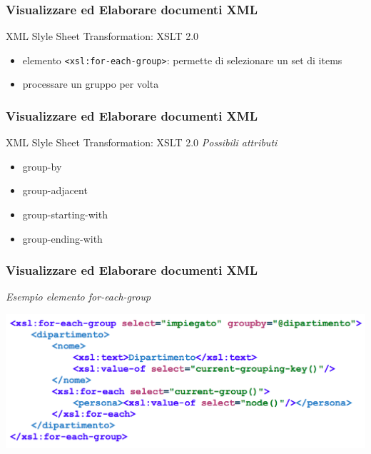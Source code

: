 \begin{frame}
    \frametitle{Visualizzare ed Elaborare documenti XML}
    \addtocounter{nframe}{1}
    

     \begin{block}{XML Slyle Sheet Transformation: XSLT 2.0}
        \begin{itemize}
            \item elemento \texttt{<xsl:for-each-group>}: permette di selezionare un set di items
            \item processare un gruppo per volta
        \end{itemize}
        
     \end{block}

\end{frame}

\begin{frame}
    \frametitle{Visualizzare ed Elaborare documenti XML}
    \addtocounter{nframe}{1}
    
     \begin{block}{XML Slyle Sheet Transformation: XSLT 2.0}
        \textit{Possibili attributi}
        \begin{itemize}
            \item group-by
            \item group-adjacent
            \item group-starting-with
            \item group-ending-with
        \end{itemize}
    
    \end{block}

\end{frame}

\begin{frame}
    \frametitle{Visualizzare ed Elaborare documenti XML}
    \addtocounter{nframe}{1}
    
        \textit{Esempio elemento for-each-group}

    \begin{center}
        \includegraphics[width=.95\textwidth]{imgs/esempio-groupBy.png}
    \end{center}

\end{frame}

